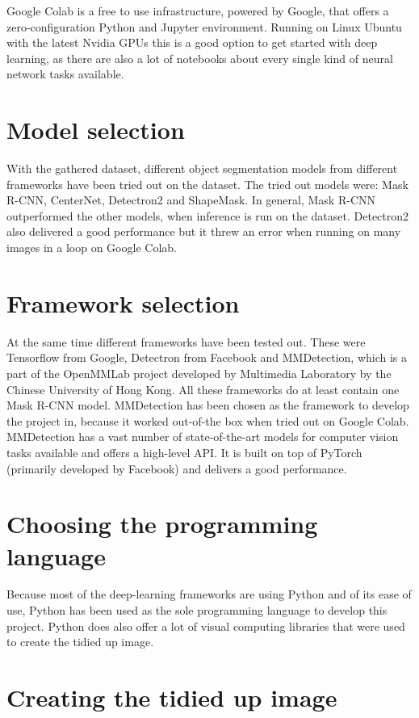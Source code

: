 Google Colab is a free to use infrastructure, powered by Google, that offers a zero-configuration Python and Jupyter environment. Running on Linux Ubuntu with the latest Nvidia GPUs this is a good option to get started with deep learning, as there are also a lot of notebooks about every single kind of neural network tasks available.

\section{Model selection}

With the gathered dataset, different object segmentation models from different frameworks have been tried out on the dataset.
The tried out models were: Mask R-CNN, CenterNet, Detectron2 and ShapeMask. In general, Mask R-CNN outperformed the other models, when inference is run on the dataset. Detectron2 also delivered a good performance but it threw an error when running on many images in a loop on Google Colab.

\section{Framework selection}

At the same time different frameworks have been tested out. These were Tensorflow from Google, Detectron from Facebook and MMDetection, which is a part of the OpenMMLab project developed by Multimedia Laboratory by the Chinese University of Hong Kong. All these frameworks do at least contain one Mask R-CNN model. MMDetection has been chosen as the framework to develop the project in, because it worked out-of-the box when tried out on Google Colab. MMDetection has a vast number of state-of-the-art models for computer vision tasks available and offers a high-level API. It is built on top of PyTorch (primarily developed by Facebook) and delivers a good performance.

\section{Choosing the programming language}

Because most of the deep-learning frameworks are using Python and of its ease of use, Python has been used as the sole programming language to develop this project. Python does also offer a lot of visual computing libraries that were used to create the tidied up image.

\section{Creating the tidied up image}

